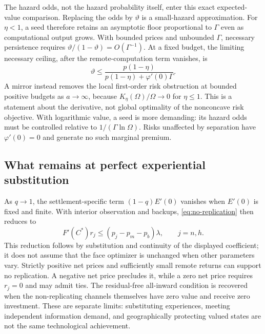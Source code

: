 The hazard odds, not the hazard probability itself, enter this exact
expected-value comparison. Replacing the odds by $\vartheta$ is a
small-hazard approximation. For $\eta<1$, a seed therefore retains an
asymptotic floor proportional to $\Gamma$ even as computational output
grows. With bounded prices and unbounded $\Gamma$, necessary persistence
requires $\vartheta/(1-\vartheta)=O(\Gamma^{-1})$. At a fixed budget,
the limiting necessary ceiling, after the remote-computation term vanishes,
is
\begin{equation}
 \vartheta\leq
 \frac{p(1-\eta)}{p(1-\eta)+\varphi'(0)\Gamma}.
 \label{eq:hazard-ceiling}
\end{equation}
A mirror instead removes the local first-order risk obstruction at bounded
positive budgets as $a\to\infty$, because
$K_\eta(\Omega)/\Omega\to0$ for $\eta\leq1$. This is a statement about
the derivative, not global optimality of the nonconcave risk objective.
With logarithmic value, a seed is more demanding: its hazard odds must
be controlled relative to $1/(\Gamma\ln\Omega)$. Risks unaffected by
separation have $\varphi'(0)=0$ and generate no such marginal premium.

\subsection{What remains at perfect experiential substitution}
As $q\to1$, the settlement-specific term $(1-q)E'(0)$ vanishes when
$E'(0)$ is fixed and finite. With interior observation and backups,
\cref{eq:no-replication} then reduces to
\begin{equation}
 F'(C^*)r_j\leq(p_j-p_m-p_b)\lambda,\qquad j=n,h.
 \label{eq:replication-reduced}
\end{equation}
This reduction follows by substitution and continuity of the displayed
coefficient; it does not assume that the face optimizer is unchanged
when other parameters vary. Strictly positive net prices and sufficiently
small remote returns can support no replication. A negative net price
precludes it, while a zero net price requires $r_j=0$ and may admit ties.
The residual-free all-inward condition is recovered when the non-replicating
channels themselves have zero value and receive zero investment. These
are separate limits: substituting experiences, meeting independent
information demand, and geographically protecting valued states are not
the same technological achievement.
